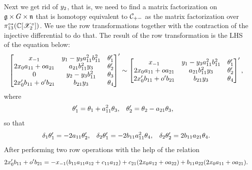 

Next we get rid of $y_2$, that is, we need to find
a matrix factorization on $\mathfrak{g}\times G\times \mathfrak{n}$ that is homotopy equivalent to $\mathcal{C}_{+-}$ as
the matrix factorization over $\pi_{13}^{\circ *}(\mathbb{C}[\mathscr{X}_2^\circ])$. We use the row transformations together with the contraction of the injective differential to do that. The result of the row transformation is the LHS of the equation below:
\begin{equation*}%
\begin{bmatrix}
\xmo & \yo - \yh\exaoo^2\exboo^2 & \theta'_1
\\
2\xz \exaoo + \xo\exato & \exato\exboo^2\yh & \theta'_2
\\
0 & \yt - \yh\exboo^2 & \theta_3
\\
2\xz' \exboo + \xo'\exbto & \exbto\yh & \theta_4
\end{bmatrix}' \sim
\begin{bmatrix}
\xmo & \yo - \yh\exaoo^2\exboo^2 & \theta'_1
\\
2\xz \exaoo + \xo\exato & \exato\exboo^2\yh & \theta'_2
\\
2\xz' \exboo + \xo'\exbto & \exbto\yh & \theta_4
\end{bmatrix}',
\end{equation*}
where
\begin{align*}
\theta'_1 & = \theta_1 +a_{11}^2\theta_3, &
\theta'_2 & = \theta_2 - a_{21}\theta_3,
\end{align*}
so that
\begin{align*}
\delta_{1} \theta'_1 &= -2a_{11}\theta'_2,
&
\delta_{2}\theta'_1 & = -2b_{11}a_{11}^2\theta_4,&
\delta_{2}\theta'_2 =  2b_{11}a_{21}\theta_4.
\end{align*}
After performing two row operations with the help of the relation
\begin{equation*}
2x_{0}' b_{11} + o'b_{21} =
-x_{-1}(b_{11}a_{11}a_{12}+c_{11}a_{12})
+c_{21}(2x_{0}a_{12} + oa_{22}) + b_{11}a_{22}(2x_{0}a_{11} + oa_{21}).
\end{equation*}
